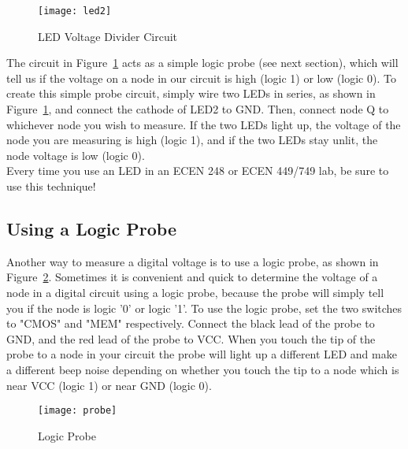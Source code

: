 \documentclass[11pt,twoside,titlepage]{article}
\begin{document}
\begin{figure}[!h]
	\centering 
	\texttt{[image: led2]}
	\caption{LED Voltage Divider Circuit}
	\label{led2}
\end{figure}

\noindent
The circuit in Figure~\ref{led2} acts as a simple logic probe (see next section), which will tell us if the voltage on a node in our circuit is high (logic 1) or low (logic 0). To create this simple probe circuit, simply wire two LEDs in series, as shown in Figure~\ref{led2}, and connect the cathode of LED2 to GND. Then, connect node Q to  whichever node you wish to measure. If the two LEDs light up, the voltage of the node you are measuring is high (logic 1), and if the two LEDs stay unlit, the node voltage is low (logic 0).\\

\noindent
Every time you use an LED in an ECEN 248 or ECEN 449/749 lab, be sure to use this technique!



\subsection{Using a Logic Probe}

\noindent
Another way to measure a digital voltage is to use a logic probe, as shown in Figure~\ref{probe}. Sometimes it is convenient and quick to determine the voltage of a node in a digital circuit using a logic probe, because the probe will simply tell you if the node is logic '0' or logic '1'. To use the logic probe, set the two switches to "CMOS" and "MEM" respectively. Connect the black lead of the probe to GND, and the red lead of the probe to VCC. When you touch the tip of the probe to a node in your circuit the probe will light up a different LED and make a different beep noise depending on whether you touch the tip to a node which is near VCC (logic 1) or near GND (logic 0). 
\begin{figure}[!h]
	\centering 
	\texttt{[image: probe]}
	\caption{Logic Probe}
	\label{probe}
\end{figure}
\end{document}
